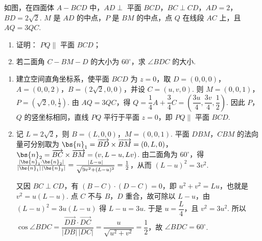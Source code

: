 \begin{problem}
如图，在四面体 \(A - BCD\) 中，\(AD \perp\) 平面 \(BCD\)，\(BC \perp CD\)，\(AD = 2\)，\(BD = 2\sqrt{2}\). \(M\) 是 \(AD\) 的中点，\(P\) 是 \(BM\) 的中点，点 \(Q\) 在线段 \(AC\) 上，且 \(AQ = 3QC\).

\vspace{-0.5em}

\begin{enumerate}
\item 证明： \(PQ\parallel\) 平面 \(BCD\)；
\item 若二面角 \(C - BM - D\) 的大小为 \(60^{\circ}\)，求 \(\angle BDC\) 的大小.
\end{enumerate}

\end{problem}

\begin{solution}
\begin{enumerate}
\item 建立空间直角坐标系，使平面 \(BCD\) 为 \(z=0\)，取 \(D=(0,0,0)\)，\(A=(0,0,2)\)，\(B=(2\sqrt2,0,0)\)，并设 \(C=(u,v,0)\). 则 \(M=(0,0,1)\)，\(P=(\sqrt2,0,\frac12)\). 由 \(AQ=3QC\)，得 \(Q=\dfrac14A+\dfrac34C=\left(\dfrac{3u}{4},\dfrac{3v}{4},\dfrac12\right)\). 因此 \(P\)，\(Q\) 的竖坐标相同，直线 \(PQ\) 平行于平面 \(z=0\)，即 \(PQ\parallel\) 平面 \(BCD\).

\item 记 \(L=2\sqrt2\)，则 \(B=(L,0,0)\)，\(M=(0,0,1)\). 平面 \(DBM\)，\(CBM\) 的法向量可分别取为
\(\bs{n}_{1}=\overrightarrow{BD}\times\overrightarrow{BM}=(0,L,0)\)，\(\bs{n}_{2}=\overrightarrow{BC}\times\overrightarrow{BM}=(v,L-u,Lv)\). 由二面角为 \(60^{\circ}\)，得
\(\frac{|\bs{n}_{1}\cdot\bs{n}_{2}|}{|\bs{n}_{1}|\,|\bs{n}_{2}|}=\frac{|L-u|}{\sqrt{9v^{2}+(L-u)^{2}}}=\frac12\)，从而 \((L-u)^{2}=3v^{2}\).

又因 \(BC\perp CD\)，有 \((B-C)\cdot(D-C)=0\)，即 \(u^{2}+v^{2}=Lu\)，也就是 \(v^{2}=u(L-u)\). 点 \(C\) 不与 \(B\)，\(D\) 重合，故可除以 \(L-u\)，由 \((L-u)^{2}=3u(L-u)\) 得 \(L-u=3u\). 于是 \(u=\dfrac{L}{4}\)，且 \(v^{2}=3u^{2}\). 所以
\(\cos\angle BDC=\dfrac{\overrightarrow{DB}\cdot\overrightarrow{DC}}{|DB|\,|DC|}=\dfrac{u}{\sqrt{u^{2}+v^{2}}}=\dfrac12\)，故 \(\angle BDC=60^{\circ}\).
\end{enumerate}
\end{solution}

